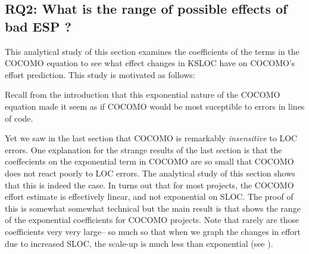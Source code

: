 \subsection{RQ2: What is the range of possible effects of bad ESP ?}\label{sect:rq2}
 This analytical study  of this section  examines the coefficients of the terms in the COCOMO equation
 to see what effect changes in KSLOC have on COCOMO's effort prediction.
 This study is motivated as follows:
 \bi
 \item
 Recall
from the introduction that this exponential nature of the COCOMO equation 
made it seem as if COCOMO would be most suceptible to errors in lines of code.
\item
Yet we saw in the last section that COCOMO is remarkably {\em insensitive} to LOC errors.
\ei
One explanation for the strange results of the last section is that the coeffecients
on the exponential term in   COCOMO   are so small that COCOMO does not
react poorly to LOC errors.
The analytical study of this section shows that this is indeed the case. In turns
out that for most projects, the COCOMO effort estimate is effectively linear, and not exponential
on SLOC.
The proof of this is somewhat somewhat technical but the main result is  
that shows the range  of the exponential coefficients for  COCOMO projects. Note that rarely are those coefficients very very large-- so much so that when we graph the changes in effort due to increased SLOC, the scale-up
is much less than exponential (see ).



